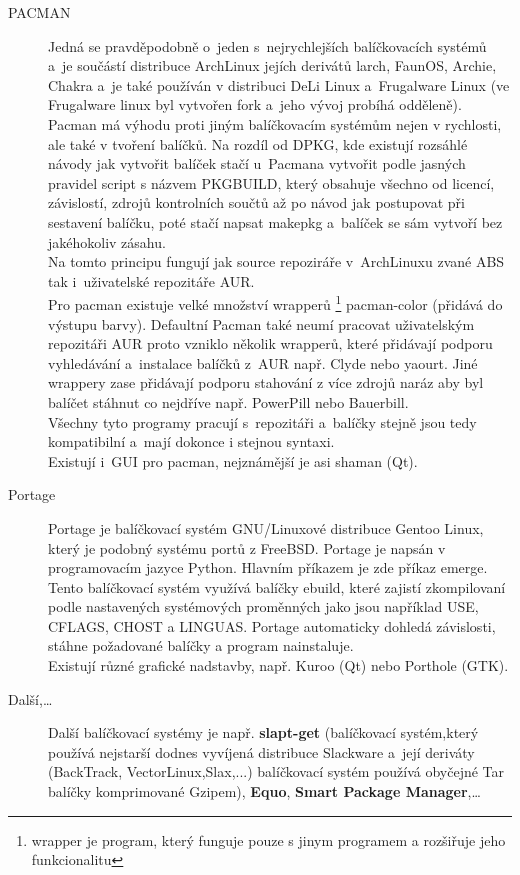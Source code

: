 \documentclass[a4paper,12pt]{article}
\renewcommand{\b}[1]{\textbf{#1}} %
\begin{document}
\begin{description}
 \item[PACMAN] Jedná se pravděpodobně o~jeden s~nejrychlejších balíčkovacích systémů a~je součástí distribuce ArchLinux jejích derivátů larch, FaunOS, Archie, Chakra a~je také používán v distribuci DeLi Linux a~Frugalware Linux (ve Frugalware linux byl vytvořen fork a~jeho vývoj probíhá odděleně). Pacman má výhodu proti jiným balíčkovacím systémům nejen v rychlosti, ale také v tvoření balíčků. Na rozdíl od DPKG, kde existují rozsáhlé návody jak vytvořit balíček stačí u~Pacmana vytvořit podle jasných pravidel script s názvem PKGBUILD, který obsahuje všechno od licencí, závislostí, zdrojů kontrolních součtů až po návod jak postupovat při sestavení balíčku, poté stačí napsat makepkg a~balíček se sám vytvoří bez jakéhokoliv zásahu.\\
Na tomto principu fungují jak source repoziráře v~ArchLinuxu zvané ABS tak i~uživatelské repozitáře AUR.\\
Pro pacman existuje velké množství wrapperů
\footnote{wrapper je program, který funguje pouze s jinym programem a rozšiřuje jeho funkcionalitu} pacman-color (přidává do výstupu barvy). Defaultní Pacman také neumí pracovat uživatelským repozitáři AUR proto vzniklo několik wrapperů, které přidávají podporu vyhledávání a~instalace balíčků z~AUR např. Clyde nebo yaourt. Jiné wrappery zase přidávají podporu stahování z více zdrojů naráz aby byl balíčet stáhnut co nejdříve např. PowerPill nebo Bauerbill.\\
Všechny tyto programy pracují s~repozitáři a~balíčky stejně jsou tedy kompatibilní a~mají dokonce i stejnou syntaxi.\\
Existují i~GUI pro pacman, nejznámější je asi shaman (Qt).
 \item[Portage] Portage je balíčkovací systém GNU/Linuxové distribuce Gentoo Linux, který je podobný systému portů z FreeBSD. Portage je napsán v programovacím jazyce Python. Hlavním příkazem je zde příkaz emerge. Tento balíčkovací systém využívá balíčky ebuild, které zajistí zkompilovaní podle nastavených systémových proměnných jako jsou například USE, CFLAGS, CHOST a LINGUAS. Portage automaticky dohledá závislosti, stáhne požadované balíčky a program nainstaluje.\\
Existují různé grafické nadstavby, např. Kuroo (Qt) nebo Porthole (GTK).
 \item[Další,…] Další balíčkovací systémy je např. \b{slapt-get} (balíčkovací systém,který používá nejstarší dodnes vyvíjená distribuce Slackware a~její deriváty (BackTrack, VectorLinux,Slax,...) balíčkovací systém používá obyčejné Tar balíčky komprimované Gzipem), \b{Equo}, \b{Smart Package Manager},…
 \end{description}
\end{document}
